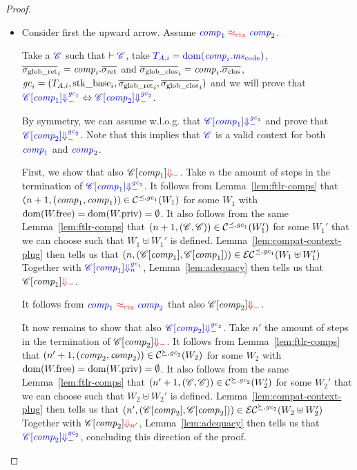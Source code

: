 \documentclass[a4paper]{article}
\begin{document}
\begin{proof}
  \begin{itemize}
  \item Consider first the upward arrow.
    Assume $\src{\var{comp}_1} \tconeq \src{\var{comp}_2}$.

    Take a $\src{\context}$ such that $\vdash \src{\context}$, take $\src{\ta[,i]}
    = \src{\dom(\var{comp}_i.\mscode)}$, $\gsigrets_i = \var{comp}_i.\sigrets$ and
    $\gsigcloss_i = \var{comp}_i.\sigcloss$, $\gc_i = (\ta[,i],\stkb_i,\gsigrets_i,\gsigcloss_i)$ and we will prove that
    $\src{\plug{\context}{\var{comp}_1} \sterm{\gc_1}} \Leftrightarrow
    \src{\plug{\context}{\var{comp}_2} \sterm{\gc_2}}$.

    By symmetry, we can assume w.l.o.g. that $\src{\plug{\context}{\var{comp}_1} \sterm{\gc_1}}$ and prove that $\src{\plug{\context}{\var{comp}_2} \sterm{\gc_2}}$.
    Note that this implies that $\src{\context}$ is a valid context for both $\src{\var{comp}_1}$ and $\src{\var{comp}_2}$.

    First, we show that also $\plug{\context}{\var{comp}_1} \trg{\term}$.
    Take $n$ the amount of steps in the termination of $\src{\plug{\context}{\var{comp}_1} \sterm{\gc_1}}$.
    It follows from Lemma~\ref{lem:ftlr-comps} that $\npair[n+1]{(\var{comp}_1,\var{comp}_1)} \in \lrcomp[\preceq,\gc_1](W_1)$ for some $W_1$ with $\dom(\pwfree) = \dom(\pwpriv) = \emptyset$.
    It also follows from the same Lemma~\ref{lem:ftlr-comps} that $\npair[n+1]{(\context,\context)} \in \lrcomp[\preceq,\gc_1](W_1')$ for some $W_1'$ that we can choose such that $W_1 \uplus W_1'$ is defined.
    Lemma~\ref{lem:compat-context-plug} then tells us that $\npair{(\plug{\context}{\var{comp}_1}, \plug{\context}{\var{comp}_1})} \in \lrec[\preceq,\gc_1](W_1\uplus W_1')$
    Together with $\src{\plug{\context}{\var{comp}_1} \sterm[n]{\gc_1}}$, Lemma~\ref{lem:adequacy} then tells us that $\plug{\context}{\var{comp}_1} \trg{\term}$.

    It follows from $\src{\var{comp}_1} \tconeq \src{\var{comp}_2}$ that also $\plug{\context}{\var{comp}_2} \trg{\term}$.

    It now remains to show that also $\src{\plug{\context}{\var{comp}_2} \sterm{\gc_2}}$.
    Take $n'$ the amount of steps in the termination of $\plug{\context}{\var{comp}_2} \trg{\term}$.
    It follows from Lemma~\ref{lem:ftlr-comps} that $\npair[n'+1]{(\var{comp}_2,\var{comp}_2)} \in \lrcomp[\succeq,\gc_2](W_2)$ for some $W_2$ with $\dom(\pwfree) = \dom(\pwpriv) = \emptyset$.
    It also follows from the same Lemma~\ref{lem:ftlr-comps} that $\npair[n'+1]{(\context,\context)} \in \lrcomp[\succeq,\gc_2](W_2')$ for some $W_2'$ that we can choose such that $W_2 \uplus W_2'$ is defined.
    Lemma~\ref{lem:compat-context-plug} then tells us that $\npair[n']{(\plug{\context}{\var{comp}_2}, \plug{\context}{\var{comp}_2})} \in \lrec[\succeq,\gc_2](W_2\uplus W_2')$
    Together with $\plug{\context}{\var{comp}_2} \trg{\term[n']}$, Lemma~\ref{lem:adequacy} then tells us that $\src{\plug{\context}{\var{comp}_2} \sterm{\gc_2}}$, concluding this direction of the proof.


\end{itemize}
\end{proof}
\end{document}
